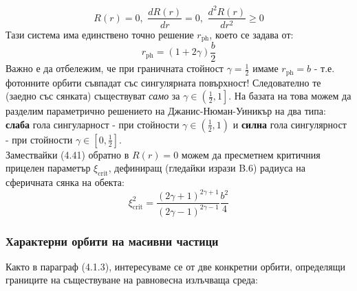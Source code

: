 	\begin{equation}
		R(r) = 0,\,\, \frac{dR(r)}{dr} = 0,\,\, \frac{d^2R(r)}{dr^2} \ge 0
	\end{equation}
Тази система има единствено точно решение $r_\text{ph}$, което се задава от:
\begin{equation}
	r_{\text{ph}} = (1 + 2\gamma)\frac{b}{2}
\end{equation}
Важно е да отбележим, че при граничната стойност $\gamma = \frac{1}{2}$ имаме $r_{\text{ph}} = b$ - т.е. фотонните орбити съвпадат със сингулярната повърхност! Следователно те (заедно със сянката) съществуват \emph{само} за $\gamma \in \left(\frac{1}{2}, 1\right]$. На базата на това можем да разделим параметрично решението на Джанис-Нюман-Уиникър на два типа: \textbf{слаба} гола сингуларност - при стойности $\gamma \in \left(\frac{1}{2},1\right)$ и \textbf{силна} гола сингулярност - при стойности $\gamma \in \left[0,\frac{1}{2}\right]$.\\\newline
Замествайки (4.41) обратно в $R(r) = 0$ можем да пресметнем критичния прицелен параметър $\xi_\text{crit}$, дефиниращ (гледайки изрази B.6) радиуса на сферичната сянка на обекта:
\begin{equation}
	\xi_\text{crit}^2 = \frac{(2\gamma + 1)^{2\gamma + 1}}{(2\gamma - 1)^{2\gamma - 1}}\frac{b^2}{4}
\end{equation}
\subsubsection{Характерни орбити на масивни частици}

Както в параграф (4.1.3), интересуваме се от две конкретни орбити, определящи границите на съществуване на равновесна излъчваща среда:\\

